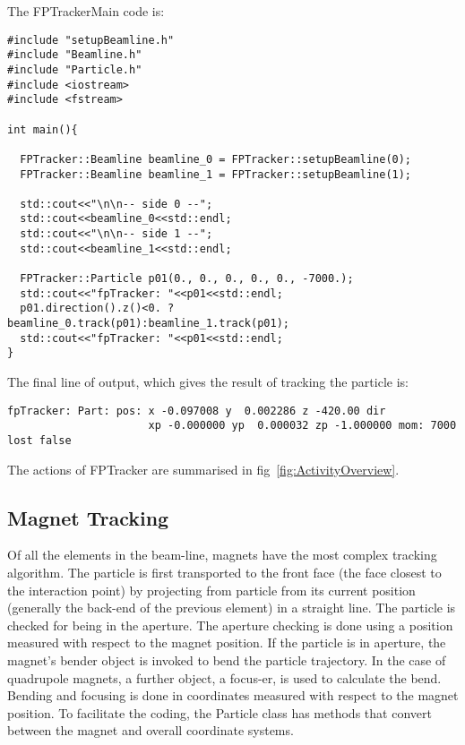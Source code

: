\documentclass[a4paper,12pt]{article}
\begin{document}
The FPTrackerMain code is:
\begin{verbatim}
#include "setupBeamline.h"
#include "Beamline.h"
#include "Particle.h"
#include <iostream>
#include <fstream>

int main(){

  FPTracker::Beamline beamline_0 = FPTracker::setupBeamline(0);
  FPTracker::Beamline beamline_1 = FPTracker::setupBeamline(1);

  std::cout<<"\n\n-- side 0 --";
  std::cout<<beamline_0<<std::endl;
  std::cout<<"\n\n-- side 1 --";
  std::cout<<beamline_1<<std::endl;

  FPTracker::Particle p01(0., 0., 0., 0., 0., -7000.);
  std::cout<<"fpTracker: "<<p01<<std::endl;
  p01.direction().z()<0. ? beamline_0.track(p01):beamline_1.track(p01);
  std::cout<<"fpTracker: "<<p01<<std::endl;
}
\end{verbatim}

The final line of output, which gives the result of tracking the particle is:
  
\begin{verbatim}
fpTracker: Part: pos: x -0.097008 y  0.002286 z -420.00 dir  
                      xp -0.000000 yp  0.000032 zp -1.000000 mom: 7000 lost false
\end{verbatim}

The actions of FPTracker are summarised in fig~\ref{fig:ActivityOverview}.

\begin{figure}
  \begin{center}
  \end{center} 
\end{figure}

\subsection{Magnet Tracking}
Of all the elements in the beam-line, magnets have the most complex tracking algorithm. The particle is first
transported to the front face (the face closest to the interaction point) by projecting from particle from its
current position (generally the back-end of the previous element) in a straight line. The particle is checked for being
in the aperture. The aperture checking is done using a position measured with respect to the magnet position. If the
particle is in aperture, the magnet's bender object is invoked to bend the particle trajectory. In the case of
quadrupole magnets, a further object, a focus-er, is used to calculate the bend. Bending and focusing is done in 
coordinates measured with respect to the magnet position. To facilitate the coding, the Particle class has methods
that convert between the magnet and overall coordinate systems. 
\end{document}
